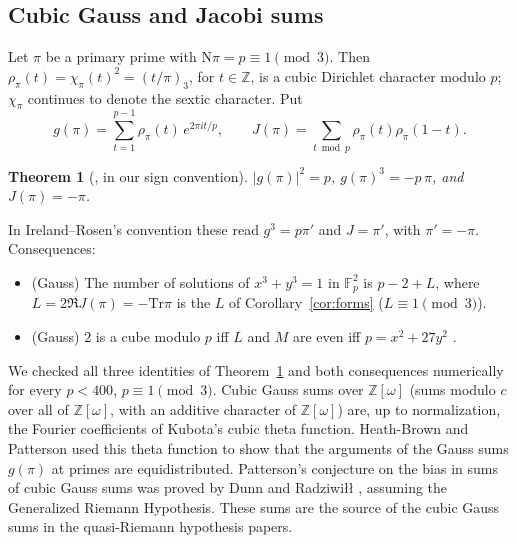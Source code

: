 \documentclass[11pt]{article}
\numberwithin{equation}{section}
\newcommand{\N}{\mathrm N}
\newcommand{\Tr}{\mathrm{Tr}}
\newcommand{\OO}{\mathbb Z[\omega]}
\newcommand{\Z}{\mathbb Z}
\newcommand{\F}{\mathbb F}
\newtheorem{theorem}{Theorem}
\theoremstyle{definition}
\theoremstyle{remark}
\begin{document}
\subsection{Cubic Gauss and Jacobi sums}\label{sec:gauss}
Let $\pi$ be a primary prime with $\N\pi=p\equiv1\pmod3$. Then $\rho_\pi(t)=\chi_\pi(t)^2=(t/\pi)_3$, for $t\in\Z$,
is a cubic Dirichlet character modulo $p$; $\chi_\pi$ continues to denote the sextic character. Put
\begin{equation}\label{eq:gaussjacobi}
 g(\pi)=\sum_{t=1}^{p-1}\rho_\pi(t)\,e^{2\pi it/p},\qquad
 J(\pi)=\sum_{t\bmod p}\rho_\pi(t)\rho_\pi(1-t).
\end{equation}
\begin{theorem}[{\cite[Ch.~8--9]{IR}}, in our sign convention]\label{thm:gauss}
$|g(\pi)|^2=p$, \quad $g(\pi)^3=-p\,\pi$, \quad and $J(\pi)=-\pi$.
\end{theorem}
In Ireland--Rosen's convention these read $g^3=p\pi'$ and $J=\pi'$, with $\pi'=-\pi$. Consequences:
\begin{itemize}
\item (Gauss) The number of solutions of $x^3+y^3=1$ in $\F_p^2$ is $p-2+L$, where
$L=2\Re J(\pi)=-\Tr\pi$ is the $L$ of Corollary~\ref{cor:forms} ($L\equiv1\pmod 3$).
\item (Gauss) $2$ is a cube modulo $p$ iff $L$ and $M$ are even iff $p=x^2+27y^2$ \cite[\S4]{Cox}.
\end{itemize}
We checked all three identities of Theorem~\ref{thm:gauss} and both consequences numerically for every
$p<400$, $p\equiv1\pmod 3$. Cubic Gauss sums over $\OO$ (sums modulo $c$ over all of $\OO$, with
an additive character of $\OO$) are, up to normalization, the Fourier coefficients of Kubota's
cubic theta function. Heath-Brown and Patterson \cite{HBP} used this theta function to show that the arguments of the
Gauss sums $g(\pi)$ at primes are equidistributed. Patterson's conjecture on the bias in sums of
cubic Gauss sums was proved by Dunn and Radziwi\l\l{} \cite{DR}, assuming the Generalized Riemann
Hypothesis.
These sums are the source of the cubic Gauss sums in the quasi-Riemann hypothesis papers.
\end{document}

